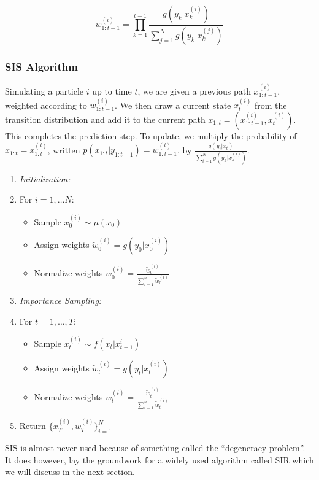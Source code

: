 \documentclass{article}
\begin{document}
\begin{equation}
w_{1:t-1}^{(i)} = \prod_{k=1}^{t-1} \frac{g(y_k|x_k^{(i)})}{\sum_{j=1}^N g(y_k|x_k^{(j)})}
\end{equation}

\subsubsection{SIS Algorithm}
Simulating a particle $i$ up to time $t$, we are given a previous path $x_{1:t-1}^{(i)}$, weighted according to $w_{1:t-1}^{(i)}$. We then draw a current state $x_{t}^{(i)}$ from the transition distribution and add it to the current path $x_{1:t} = (x_{1:t-1}^{(i)},x_t^{(i)})$. This completes the prediction step. To update, we multiply the probability of $x_{1:t} = x_{1:t}^{(i)}$, written $p(x_{1:t}|y_{1:t-1}) = w_{1:t-1}^{(i)}$, by $\frac{g(y_t|x_t)}{\sum_{i=1}^N g(y_k|x_k^{(i)})}$.

\begin{enumerate}
\item \textit{Initialization:}
\item[] For $i=1,\dots N$:
\begin{itemize}
\item[] Sample $x_0^{(i)} \sim \mu(x_0)$
\item[] Assign weights $\widetilde{w}_0^{(i)} = g(y_0|x_0^{(i)})$
\item[] Normalize weights $w_0^{(i)} = \frac{\widetilde{w}_0^{(i)}}{\sum_{i=1}^{n} \widetilde{w}_0^{(i)}}$
\end{itemize}
\item \textit{Importance Sampling:}
\item[] For $t=1,\dots,T$:
\begin{itemize}
\item[] Sample $x_t^{(i)} \sim f(x_t|x_{t-1}^{i})$
\item[] Assign weights $\widetilde{w}_t^{(i)} = g(y_t|x_t^{(i)})$
\item[] Normalize weights $w_t^{(i)} = \frac{\widetilde{w}_t^{(i)}}{\sum_{i=1}^{n} \widetilde{w}_t^{(i)}}$
\end{itemize}
\item Return $\{x_T^{(i)},w_T^{(i)}\}_{i=1}^N$
\end{enumerate}

SIS is almost never used because of something called the ``degeneracy problem''. It does however, lay the groundwork for a widely used algorithm called SIR which we will discuss in the next section.
\end{document}

